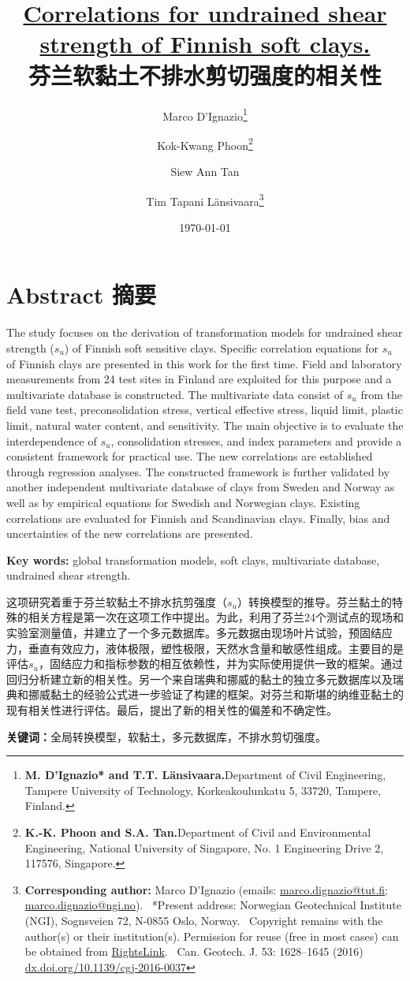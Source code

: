 \documentclass{bilidoc}
\title{\textbf{\href{http://dx.doi.org/10.1139/cgj-2016-0037}{Correlations for undrained shear strength of Finnish soft clays.}\\芬兰软黏土不排水剪切强度的相关性}}
\date{\today}
\author{Marco D’Ignazio\thanks{
    \textbf{M. D’Ignazio* and T.T. Länsivaara.}Department of Civil Engineering, Tampere University of Technology, Korkeakoulunkatu 5, 33720, Tampere, Finland.
} \and Kok-Kwang Phoon\thanks{
    \textbf{K.-K. Phoon and S.A. Tan.}Department of Civil and Environmental Engineering, National University of Singapore, No. 1 Engineering Drive 2, 117576, Singapore.
} \and Siew Ann Tan \and Tim Tapani Länsivaara\thanks{
    \textbf{Corresponding author:} Marco D’Ignazio (emails: \url{marco.dignazio@tut.ﬁ}; \url{marco.dignazio@ngi.no}).\newline{}
    \indent{}~*Present address: Norwegian Geotechnical Institute (NGI), Sognsveien 72, N-0855 Oslo, Norway.\newline{}
    \indent{}~Copyright remains with the author(s) or their institution(s). Permission for reuse (free in most cases) can be obtained from \href{https://www.nrcresearchpress.com/page/authors/services/reprints}{RightsLink}.\newline{}\newline{}
    \indent{}~Can. Geotech. J. 53: 1628–1645 (2016) \href{http://dx.doi.org/10.1139/cgj-2016-0037}{dx.doi.org/10.1139/cgj-2016-0037}
}}
\begin{document}
\maketitle

\section*{Abstract 摘要}

\begin{Parallel}{0.60\textwidth}{}
    \ParallelLText
    {
        The study focuses on the derivation of transformation models for undrained shear strength ($s_u$) of Finnish soft sensitive clays. Speciﬁc correlation equations for $s_u$ of Finnish clays are presented in this work for the ﬁrst time. Field and laboratory measurements from 24 test sites in Finland are exploited for this purpose and a multivariate database is constructed. The multivariate data consist of $s_u$ from the ﬁeld vane test, preconsolidation stress, vertical effective stress, liquid limit, plastic limit, natural water content, and sensitivity. The main objective is to evaluate the interdependence of $s_u$, consolidation stresses, and index parameters and provide a consistent framework for practical use. The new correlations are established through regression analyses. The constructed framework is further validated by another independent multivariate database of clays from Sweden and Norway as well as by empirical equations for Swedish and Norwegian clays. Existing correlations are evaluated for Finnish and Scandinavian clays. Finally, bias and uncertainties of the new correlations are presented.

        \textbf{Key words: }global transformation models, soft clays, multivariate database, undrained shear strength.
    }
    \ParallelRText
    {
        这项研究着重于芬兰软黏土不排水抗剪强度（$s_u$）转换模型的推导。芬兰黏土的特殊的相关方程是第一次在这项工作中提出。为此，利用了芬兰24个测试点的现场和实验室测量值，并建立了一个多元数据库。多元数据由现场叶片试验，预固结应力，垂直有效应力，液体极限，塑性极限，天然水含量和敏感性组成。主要目的是评估$s_u$，固结应力和指标参数的相互依赖性，并为实际使用提供一致的框架。通过回归分析建立新的相关性。另一个来自瑞典和挪威的黏土的独立多元数据库以及瑞典和挪威黏土的经验公式进一步验证了构建的框架。对芬兰和斯堪的纳维亚黏土的现有相关性进行评估。最后，提出了新的相关性的偏差和不确定性。

        \textbf{关键词：}全局转换模型，软黏土，多元数据库，不排水剪切强度。
    }
\end{Parallel}




\begin{appendix}
\end{appendix}


\end{document}
